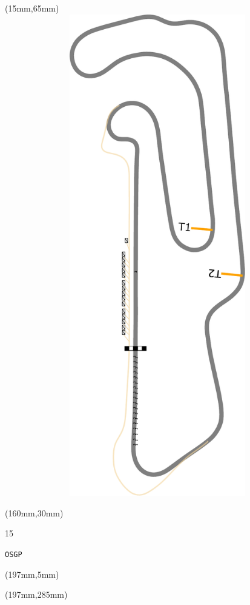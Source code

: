 \begin{textblock*}{185mm}(15mm,65mm)%
\centering
\mbox{\includegraphics[width=185mm,height=210mm,keepaspectratio]{PT/OSGP.pdf}}
\end{textblock*}
\begin{textblock*}{40mm}(160mm,30mm)%
\Large
\par{} 
\par15 
\par\hfill\tiny\tt OSGP\\
\end{textblock*}
\begin{textblock*}{20mm}(197mm,5mm)%
\fbox{\thepage}
\label{OSGP}
\end{textblock*}
\begin{textblock*}{20mm}(197mm,285mm)%
\fbox{\thepage}
\end{textblock*}

